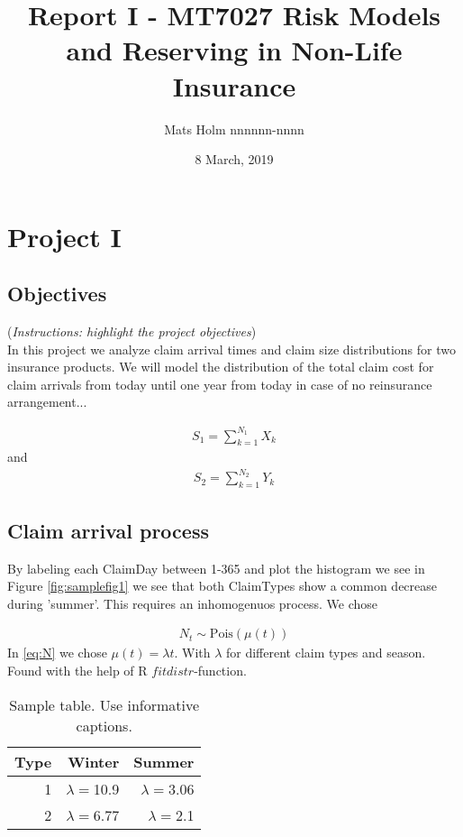 \documentclass[11pt]{article}
\title{Report I - MT7027 Risk Models and Reserving in Non-Life Insurance}
\author{Mats Holm nnnnnn-nnnn }
\date{8 March, 2019}                                           %
\begin{document}
\maketitle
\section*{Project I}
\subsection*{Objectives}
({\it Instructions: highlight the project objectives})
\\
In this project we analyze claim
arrival times and claim size distributions for two insurance products.
We will model
the distribution of the total claim cost for claim arrivals from today until one year from
today in case of no reinsurance arrangement...

\begin{align} \label{eq:sum1}
	S_1 = \sum_{k=1}^{N_1}  X_k   
\end{align}
and
\begin{align} \label{eq:sum2}
	 S_2 = \sum_{k=1}^{N_2} Y_k
\end{align}


\subsection*{Claim arrival process}
By labeling each ClaimDay between 1-365 and plot the histogram we see in Figure \ref{fig:samplefig1} we see that both ClaimTypes show a common decrease during 'summer'. This requires an inhomogenuos process. We chose

\begin{align}\label{eq:N}
	N_t  \sim  \mathrm{Pois}(\mu(t))
\end{align}
In \eqref{eq:N} we chose $\mu(t) = \lambda t$. With $\lambda$ for different claim types and season. Found with the help of R $fitdistr$-function.


\begin{table}[!ht]
\center
\begin{tabular}{r|rr}
Type & Winter & Summer \\ 
\hline
1 & $\lambda=$10.9 & $\lambda=$3.06 \\
2 & $\lambda=$6.77 & $\lambda=$2.1\\
\hline
\end{tabular}
\caption{Sample table. Use informative captions.} \label{tab:sampletab}
\end{table}
\end{document}
